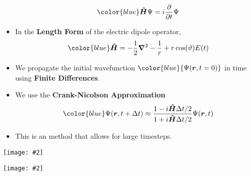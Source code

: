 \documentclass[landscape,a0b,final]{a0poster}
\newenvironment{poster}{
  \begin{center}
  \begin{minipage}[c]{0.98\textwidth}
}{
  \end{minipage} 
  \end{center}
}
\newcommand{\pbox}[4]{
\psshadowbox[#3]{
\begin{minipage}[t][#2][t]{#1}
#4
\end{minipage}
}}
\newcommand{\myfig}[3][0]{
\begin{center}
  \vspace{1.5cm}
  \texttt{[image: \#2]}
  \nobreak\medskip
\end{center}}
\begin{document}
\begin{poster}
\begin{multicols}{3}
\begin{itemize}
\vspace{-.5cm}
\begin{equation}
{\color{blue}\bm{\hat{H}}\Psi = i\frac{\partial}{\partial t} \Psi}
\end{equation}
\item {In the \bf\color{red}Length Form} of the electric dipole operator,
\begin{equation}
{\color{blue}\bm{\hat{H}} = -\frac{1}{2} \bm{\nabla}^2 - \frac{1}{r} +r \cos(\vartheta) E(t)}
\end{equation}
\vspace{-.5cm}
\item We propagate the initial wavefunction ${\color{blue}{\Psi(\bm{r},t=0)}}$ in time using {\bf \color{newgreen}Finite Differences}. 
\item We use the {\bf \color{newgreen} Crank-Nicolson Approximation} 
\vspace{-.5cm}
\begin{equation}
{\color{blue}\Psi(\bm{r},t+\Delta t) \approx \frac{1-i\bm{\hat{H}}\Delta t/2}{1+i\bm{\hat{H}}\Delta t/2}\Psi(\bm{r},t)}
\end{equation}
\vspace{-.5cm}
\item This is an {\color{newgreen}{\bf implicit}} method that allows for large timesteps.
\end{itemize}

\vspace{0.375cm}\begin{center}\pbox{0.8\columnwidth}{}{linewidth=2mm,framearc=0.1,linecolor=lightblue,fillstyle=gradient,
                          gradangle=0,gradbegin=whiteblue,gradend=whiteblue,gradmidpoint=1.0,framesep=1em}{\begin{center}{\Large\bf The Field}\end{center}}\end{center}

  \vspace{-0.75cm}
  \setlength{\columnsep}{0pt}
  \setlength{\columnseprule}{0pt}
  \hspace{-2cm}
  \begin{multicols}{2}
  \begin{center}
  \myfig{c_pulse_350_2_36_2.ps}{.85}
  \end{center}

  \begin{center}
  \myfig{c_fourier_350_2_36_2.ps}{.85}
  \end{center}
  \end{multicols}


\end{multicols}
\end{poster}
\end{document}
